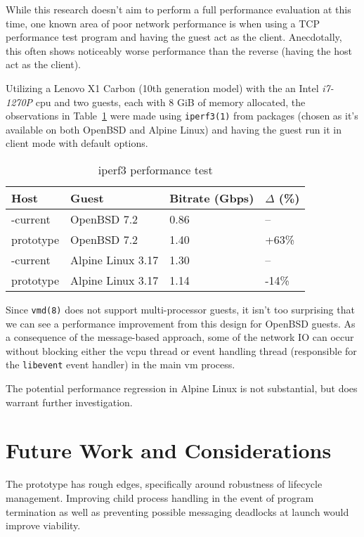 \documentclass[conference]{IEEEtran}
\begin{document}
While this research doesn't aim to perform a full performance
evaluation at this time, one known area of poor network performance is
when using a TCP performance test program and having the guest act as
the client. Anecdotally, this often shows noticeably worse performance than the reverse (having the host act as the client).

Utilizing a Lenovo X1 Carbon (10th generation model) with the an Intel
\emph{i7-1270P} cpu and two guests, each with 8 GiB of memory
allocated, the observations in Table~\ref{perf} were made using
\texttt{iperf3(1)} from packages (chosen as it's available on both
OpenBSD and Alpine Linux) and having the guest run it in client mode
with default options.

\vspace{3mm}
\begin{table}
\begin{center}
\caption{\label{perf}iperf3 performance test}
\begin{tabular}{| l | l | l | l |}
  \hline
  Host & Guest & Bitrate (Gbps) & $\Delta$ (\%) \\ \hline
  -current & OpenBSD 7.2 & 0.86 & -- \\ \hline
  prototype & OpenBSD 7.2 & 1.40 & +63\% \\ \hline
  -current & Alpine Linux 3.17 & 1.30 & --  \\ \hline
  prototype & Alpine Linux 3.17 & 1.14 & -14\%  \\ \hline
\end{tabular}
\end{center}
\end{table}

\vspace{3mm} Since \texttt{vmd(8)} does not support multi-processor
guests, it isn't too surprising that we can see a performance
improvement from this design for OpenBSD guests. As a consequence of
the message-based approach, some of the network IO can occur without
blocking either the vcpu thread or event handling thread (responsible
for the \texttt{libevent} event handler) in the main vm process.

The potential performance regression in Alpine Linux is not
substantial, but does warrant further investigation.


\vspace{5mm}
\section{Future Work and Considerations}
The prototype has rough edges, specifically around robustness of
lifecycle management. Improving child process handling in the event of
program termination as well as preventing possible messaging deadlocks
at launch would improve viability.
\end{document}
